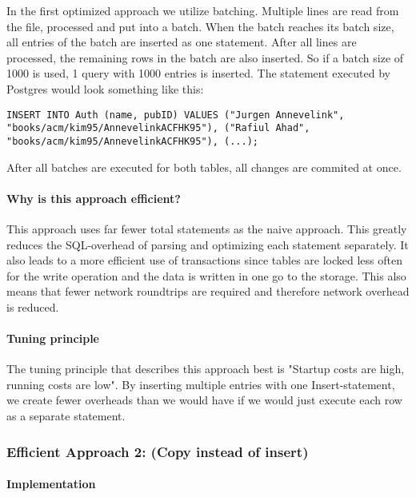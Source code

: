 \documentclass[11pt]{scrartcl}
\begin{document}
In the first optimized approach we utilize batching. Multiple lines are read from the file, processed and put into a batch. When the batch reaches its batch size, all entries of the batch are inserted as one statement. After all lines are processed, the remaining rows in the batch are also inserted. So if a batch size of 1000 is used, 1 query with 1000 entries is inserted. The statement executed by Postgres would look something like this:

\begin{lstlisting}[style=dbtsql]
INSERT INTO Auth (name, pubID) VALUES ("Jurgen Annevelink",
"books/acm/kim95/AnnevelinkACFHK95"), ("Rafiul Ahad", 
"books/acm/kim95/AnnevelinkACFHK95"), (...);
\end{lstlisting}

After all batches are executed for both tables, all changes are commited at once.

\paragraph{Why is this approach efficient?}

This approach uses far fewer total statements as the naive approach. This greatly reduces the SQL-overhead of parsing and optimizing each statement separately. It also leads to a more efficient use of transactions since tables are locked less often for the write operation and the data is written in one go to the storage. This also means that fewer network roundtrips are required and therefore network overhead is reduced. 

\paragraph{Tuning principle}

The tuning principle that describes this approach best is "Startup costs are high, running costs are low". By inserting multiple entries with one Insert-statement, we create fewer overheads than we would have if we would just execute each row as a separate statement.

\subsubsection*{Efficient Approach 2: (Copy instead of insert)}

\paragraph{Implementation}
\end{document}
